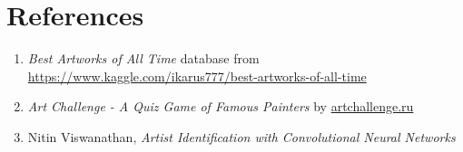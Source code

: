 \documentclass[12pt,a4paper]{article}
\begin{document}
\section*{References}
\begin{enumerate}
\item \textit{Best Artworks of All Time} database from \url{https://www.kaggle.com/ikarus777/best-artworks-of-all-time}
\item \textit{Art Challenge - A Quiz Game of Famous Painters} by \url{artchallenge.ru}
\item Nitin Viswanathan, \textit{Artist Identification with Convolutional Neural Networks}
\end{enumerate}
\end{document}
